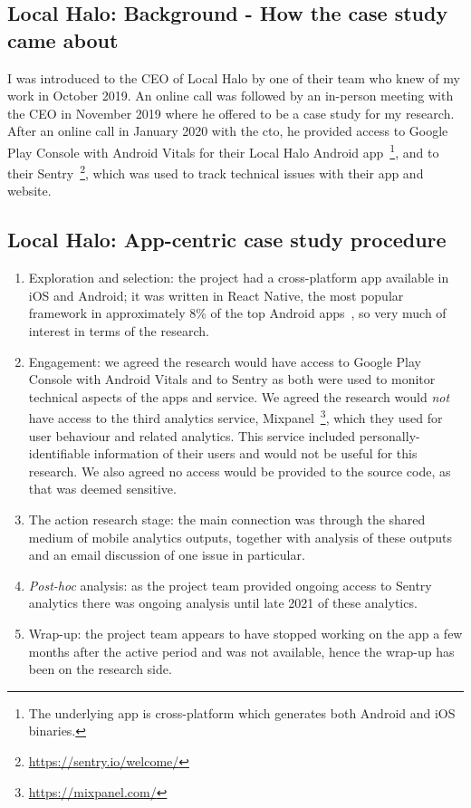 \subsection{Local Halo: Background - How the case study came about}
I was introduced to the CEO of Local Halo by one of their team who knew of my work in October 2019. An online call was followed by an in-person meeting with the CEO in November 2019 where he offered to be a case study for my research. After an online call in January 2020 with the \acrshort{cto}, he provided access to Google Play Console with Android Vitals for their Local Halo Android app~\footnote{The underlying app is cross-platform which generates both Android and iOS binaries.}, and to their Sentry~\footnote{\url{https://sentry.io/welcome/}}, which was used to track technical issues with their app and website. 

\subsection{Local Halo: App-centric case study procedure}
{\small
\begin{enumerate}
    \itemsep0em
    \item Exploration and selection: the project had a cross-platform app available in iOS and Android; it was written in React Native, the  most popular framework in approximately 8\% of the top Android apps~\cite{appbrain2021_react_native_stats}, so very much of interest in terms of the research.
    \item Engagement: we agreed the research would have access to Google Play Console with Android Vitals and to Sentry as both were used to monitor technical aspects of the apps and service. We agreed the research would \textit{not} have access to the third analytics service, Mixpanel~\footnote{\url{https://mixpanel.com/}}, which they used for user behaviour and related analytics. This service included personally-identifiable information of their users and would not be useful for this research. We also agreed no access would be provided to the source code, as that was deemed sensitive. 
    \item The action research stage: the main connection was through the shared medium of mobile analytics outputs, together with analysis of these outputs and an email discussion of one issue in particular.
    \item \textit{Post-hoc} analysis: as the project team provided ongoing access to Sentry analytics there was ongoing analysis until late 2021 of these analytics. 
    \item Wrap-up: the project team appears to have stopped working on the app a few months after the active period and was not available, hence the wrap-up has been on the research side.
\end{enumerate}
}


